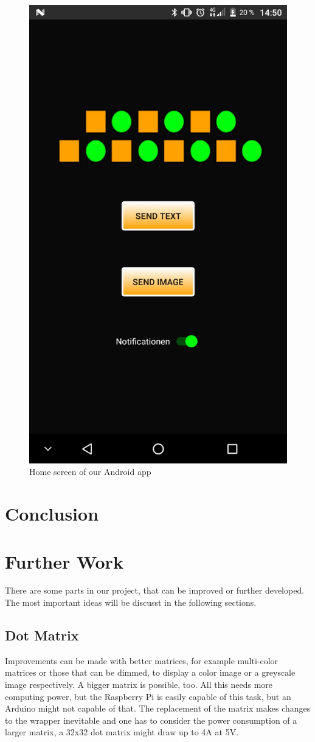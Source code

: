 \documentclass[conference]{IEEEtran}
\begin{document}
\begin{figure}[ht]
\centering
\includegraphics[width=0.75\linewidth]{pics/AppHomeScreen}
\caption{Home screen of our Android app}
\label{FIG:APP}
\end{figure}


\section{Conclusion}



\section{Further Work}
There are some parts in our project, that can be improved or further developed. The most important ideas will be discusst in the following sections.

\subsection{Dot Matrix}
Improvements can be made with better matrices, for example multi-color matrices or those that can be dimmed, to display a color image or a greyscale image respectively. A bigger matrix is possible, too. All this needs more computing power, but the Raspberry Pi is easily capable of this task, but an Arduino might not capable of that. The replacement of the matrix makes changes to the wrapper inevitable and one has to consider the power consumption of a larger matrix, a 32x32 dot matrix might draw up to 4A at 5V.
\end{document}
